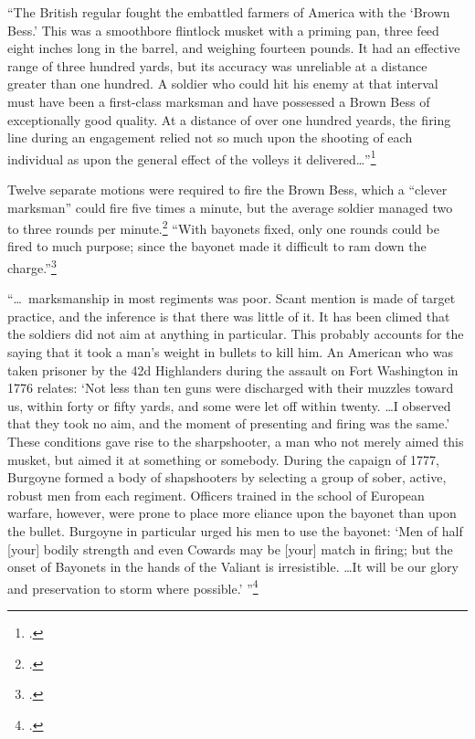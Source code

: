``The British regular fought the embattled farmers of America with the `Brown
Bess.' This was a smoothbore flintlock musket with a priming pan, three feed
eight inches long in the barrel, and weighing fourteen pounds. It had an
effective range of three hundred yards, but its accuracy was unreliable at a
distance greater than one hundred. A soldier who could hit his enemy at that
interval must have been a first-class marksman and have possessed a Brown Bess
of exceptionally good quality. At a distance of over one hundred yeards, the
firing line during an engagement relied not so much upon the shooting of each
individual as upon the general effect of the volleys it
delivered\ldots''\footcite[16]{curtis_org_1972}

Twelve separate motions were required to fire the Brown Bess, which a ``clever
marksman'' could fire five times a minute, but the average soldier managed two
to three rounds per minute.\footcite[17]{curtis_org_1972} ``With bayonets fixed,
only one rounds could be fired to much purpose; since the bayonet made it
difficult to ram down the charge.''\footcite[17]{curtis_org_1972}


``\ldots~marksmanship in most regiments was poor. Scant mention is made of target
practice, and the inference is that there was little of it. It has been climed
that the soldiers did not aim at anything in particular. This probably accounts
for the saying that it took a man's weight in bullets to kill him. An American
who was taken prisoner by the 42d Highlanders during the assault on Fort
Washington in 1776 relates: `Not less than ten guns were discharged with their
muzzles toward us, within forty or fifty yards, and some were let off within
twenty. \ldots I observed that they took no aim, and the moment of presenting
and firing was the same.' These conditions gave rise to the sharpshooter, a man
who not merely aimed this musket, but aimed it at something or somebody. During
the capaign of 1777, Burgoyne formed a body of shapshooters by selecting a group
of sober, active, robust men from each regiment. Officers trained in the school
of European warfare, however, were prone to place more eliance upon the bayonet
than upon the bullet. Burgoyne in particular urged his men to use the bayonet:
`Men of half [your] bodily strength and even Cowards may be [your] match in
firing; but the onset of Bayonets in the hands of the Valiant is irresistible.
\ldots It will be our glory and preservation to storm where possible.'
''\footcite[20-21]{curtis_org_1972}

